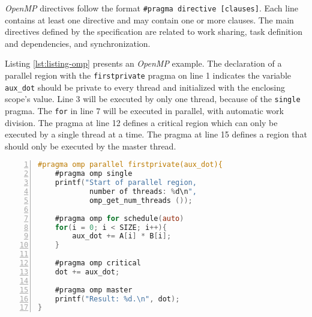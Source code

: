 \textit{OpenMP} directives follow the format \texttt{\#pragma directive
[clauses]}.  Each line contains at least one directive and may contain one or
more clauses. The main directives defined by the specification are related
to work sharing, task definition and dependencies, and synchronization.

Listing \ref{lst:listing-omp} presents an \textit{OpenMP} example. The
declaration of a parallel region with the \texttt{firstprivate} pragma on line
1 indicates the variable \texttt{aux\_dot} should be private to every thread
and initialized with the enclosing scope's value.  Line 3 will be executed by
only one thread, because of the \texttt{single} pragma.
The \texttt{for} in line 7 will be executed in parallel, with automatic work
division.  The pragma at line 12 defines a critical region which can only be
executed by a single thread at a time. The pragma at line 15 defines a
region that should only be executed by the master thread.

\begin{lstlisting}[language=C, basicstyle=\ttfamily\scriptsize, numbers=left,
                   frame=no, showspaces=false, showstringspaces=false,
                   caption={\textit{OpenMP} Sample Program}, captionpos=b,
                   numberstyle=\tiny,
                   xleftmargin=0.6cm,
                   label=lst:listing-omp, keywords={%
                       \#pragma,
                       omp, parallel, firstprivate,
                       single, omp_get_num_threads,
                       for, schedule, auto,
                       critical, master,
                       NULL, int, main,
                       void, printf, return%
                   },
                   otherkeywords={::, \#pragma, \#include, <<<,>>>, \&, \*, +, -, /, [, ], >, <}
                       ]
#pragma omp parallel firstprivate(aux_dot){
    #pragma omp single
    printf("Start of parallel region,
            number of threads: %d\n",
            omp_get_num_threads ());

    #pragma omp for schedule(auto)
    for(i = 0; i < SIZE; i++){
        aux_dot += A[i] * B[i];
    }

    #pragma omp critical
    dot += aux_dot;

    #pragma omp master
    printf("Result: %d.\n", dot);
}
\end{lstlisting}
